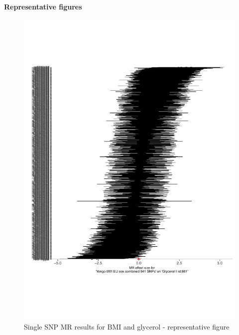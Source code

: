 \documentclass[11pt,twoside]{bristolthesis}
\begin{document}
\hypertarget{representative-figures}{%
\paragraph{Representative figures}\label{representative-figures}}
\begin{figure}
\includegraphics[width=1\linewidth]{data/chapter5/figures/singlesnp_representative_figure} \caption{Single SNP MR results for BMI and glycerol - representative figure}\label{fig:appendix-chapter5-figure-singlesnp-representative-figure}
\end{figure}
\end{document}
